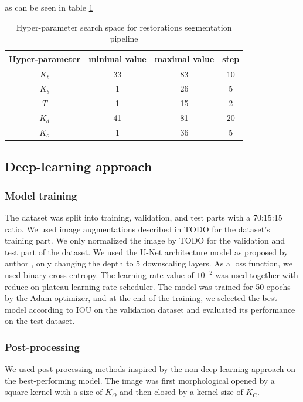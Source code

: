 as can be seen in table \ref{tab:hyper_param_segmentation}
\begin{table}
    \begin{tabular}{|c|c|c|c|}
        \hline
        Hyper-parameter & minimal value & maximal value & step \\ \hline
        $K_t$           & 33            & 83            & 10   \\ \hline
        $K_b$           & 1             & 26            & 5    \\ \hline
        $T$             & 1             & 15            & 2    \\ \hline
        $K_d$           & 41            & 81            & 20   \\ \hline
        $K_o$           & 1             & 36            & 5    \\ \hline
    \end{tabular}
    \caption{Hyper-parameter search space for restorations segmentation pipeline}
    \label{tab:hyper_param_segmentation}
\end{table}

\subsection{Deep-learning approach}
\subsubsection{Model training}
The dataset was split into training, validation, and test parts with a 70:15:15 ratio. We used image augmentations described in TODO for the dataset's training part. We only normalized the image by TODO for the validation and test part of the dataset.
We used the U-Net architecture model as proposed by author \cite{Ronneberger2015}, only changing the depth to 5 downscaling layers. As a loss function, we used binary cross-entropy. The learning rate value of $10^{-2}$ was used together with reduce on plateau learning rate scheduler. The model was trained for 50 epochs by the Adam optimizer, and at the end of the training, we selected the best model according to IOU on the validation dataset and evaluated its performance on the test dataset.

\subsubsection{Post-processing}
We used post-processing methods inspired by the non-deep learning approach on the best-performing model. The image was first morphological opened by a square kernel with a size of $K_O$ and then closed by a kernel size of $K_C$.

